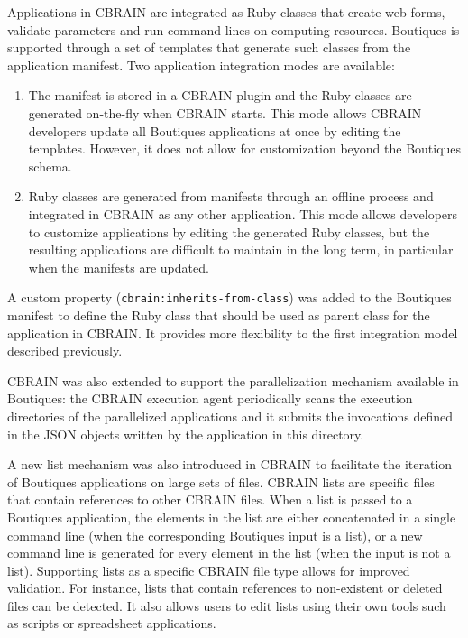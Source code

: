 \documentclass{article}
\newcommand{\boutiques}{Boutiques\xspace}
\begin{document}
Applications in CBRAIN are integrated as Ruby classes that create web
forms, validate parameters and run command lines on computing
resources. \boutiques is supported through a set of templates that
generate such classes from the application manifest. Two application
integration modes are available:
\begin{enumerate}
  \item The manifest is stored in a CBRAIN plugin and the Ruby classes
    are generated on-the-fly when CBRAIN starts. This mode allows
    CBRAIN developers update all Boutiques applications at once by
    editing the templates. However, it does not allow for
    customization beyond the Boutiques schema.
  \item Ruby classes are generated from manifests
    through an offline process and integrated in CBRAIN as any other
    application. This mode allows developers to customize applications
    by editing the generated Ruby classes, but the resulting
    applications are difficult to maintain in the long term, in
    particular when the manifests are updated.
\end{enumerate}

A custom property (\texttt{cbrain:inherits-from-class}) was added to
the Boutiques manifest to define the Ruby class that should be used as
parent class for the application in CBRAIN. It provides more
flexibility to the first integration model described previously.

CBRAIN was also extended to support the parallelization mechanism
available in Boutiques: the CBRAIN execution agent periodically scans
the execution directories of the parallelized applications and it submits
the invocations defined in the JSON objects written by the
application in this directory.

A new list mechanism was also introduced in CBRAIN to facilitate the
iteration of Boutiques applications on large sets of files. CBRAIN
lists are specific files that contain references to other CBRAIN
files. When a list is passed to a Boutiques application, the elements
in the list are either concatenated in a single command line (when the
corresponding Boutiques input is a list), or a new command line is
generated for every element in the list (when the input is not a
list). Supporting lists as a specific CBRAIN file type allows for
improved validation. For instance, lists that contain references to
non-existent or deleted files can be detected. It also allows users to
edit lists using their own tools such as scripts or spreadsheet
applications.
\end{document}
